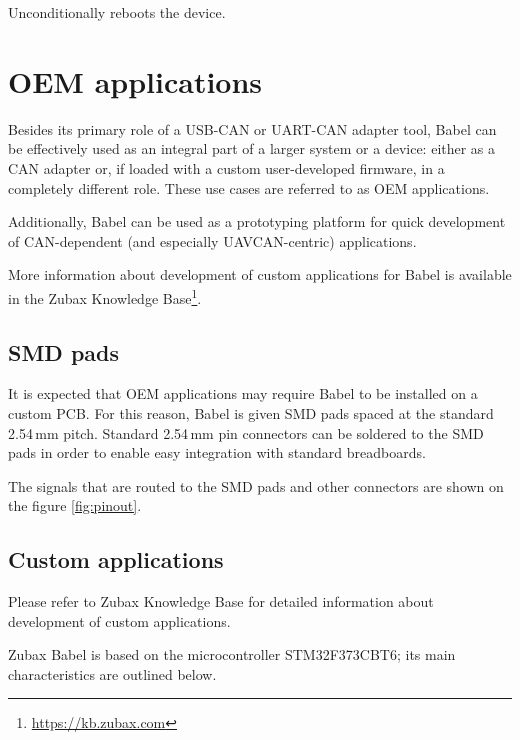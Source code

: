\documentclass{zubaxdoc}
\begin{document}
Unconditionally reboots the device.

\chapter{OEM applications}\label{sec:oem_applications}

Besides its primary role of a USB-CAN or UART-CAN adapter tool,
Babel can be effectively used as an integral part of a larger system or a device:
either as a CAN adapter or, if loaded with a custom user-developed firmware,
in a completely different role.
These use cases are referred to as OEM applications.

Additionally, Babel can be used as a prototyping platform for quick development of CAN-dependent
(and especially UAVCAN-centric) applications.

More information about development of custom applications for Babel is available in the
Zubax Knowledge Base\footnote{\url{https://kb.zubax.com}}.

\section{SMD pads}

It is expected that OEM applications may require Babel to be installed on a custom PCB.
For this reason, Babel is given SMD pads spaced at the standard 2.54\,mm pitch.
Standard 2.54\,mm pin connectors can be soldered to the SMD pads in order to enable easy integration
with standard breadboards.

The signals that are routed to the SMD pads and other connectors are shown on the figure \ref{fig:pinout}.

\section{Custom applications}

Please refer to Zubax Knowledge Base for detailed information about development of custom applications.

Zubax Babel is based on the microcontroller STM32F373CBT6; its main characteristics are outlined below.
\end{document}
